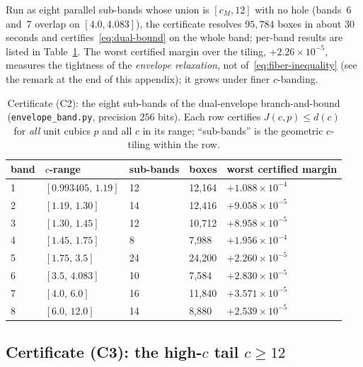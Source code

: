 Run as eight parallel sub-bands whose union is $[c_M,12]$ with no hole (bands~6 and~7 overlap on $[4.0,4.083]$), the certificate resolves $95{,}784$ boxes in about $30$ seconds and certifies~\eqref{eq:dual-bound} on the whole band; per-band results are listed in Table~\ref{tab:fq1-bands}. The worst certified margin over the tiling, $+2.26\times10^{-5}$, measures the tightness of the \emph{envelope relaxation}, not of~\eqref{eq:fiber-inequality} (see the remark at the end of this appendix); it grows under finer $c$-banding.

\begin{table}[h]\centering
\begin{tabular}{lllll}
\hline
band & $c$-range & sub-bands & boxes & worst certified margin \\
\hline
1 & $[0.993405,\,1.19]$ & 12 & 12{,}164 & $+1.088\times10^{-4}$ \\
2 & $[1.19,\,1.30]$ & 14 & 12{,}416 & $+9.058\times10^{-5}$ \\
3 & $[1.30,\,1.45]$ & 12 & 10{,}712 & $+8.958\times10^{-5}$ \\
4 & $[1.45,\,1.75]$ & 8 & 7{,}988 & $+1.956\times10^{-4}$ \\
5 & $[1.75,\,3.5]$ & 24 & 24{,}200 & $+2.260\times10^{-5}$ \\
6 & $[3.5,\,4.083]$ & 10 & 7{,}584 & $+2.830\times10^{-5}$ \\
7 & $[4.0,\,6.0]$ & 16 & 11{,}840 & $+3.571\times10^{-5}$ \\
8 & $[6.0,\,12.0]$ & 14 & 8{,}880 & $+2.539\times10^{-5}$ \\
\hline
\end{tabular}
\caption{Certificate (C2): the eight sub-bands of the dual-envelope branch-and-bound (\texttt{envelope\_band.py}, precision $256$ bits). Each row certifies $J(c,p)\le d(c)$ for \emph{all} unit cubics $p$ and all $c$ in its range; ``sub-bands'' is the geometric $c$-tiling within the row.}
\label{tab:fq1-bands}
\end{table}

\subsection{Certificate (C3): the high-$c$ tail $c\ge12$}
\label{app:cert-highc}

